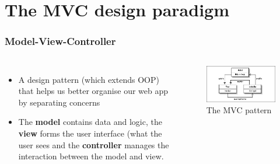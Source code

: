 \documentclass[10pt,t,xcolor=dvipsnames]{beamer}
\begin{document}
\section{The MVC design paradigm}
\begin{frame}[fragile]
\frametitle{Model-View-Controller}
\pause
\begin{columns}[l]
\begin{itemize}[<+->]
\item A design pattern (which extends OOP) that helps us better organise our web app by \alert{separating concerns}
\item The \textbf{model} contains \alert{data and logic}, the \textbf{view} forms the \alert{user interface} (what the user sees and the \textbf{controller} manages the \alert{interaction} between the model and view.
\end{itemize}
\vspace{-0.5cm}
\begin{figure}
\hspace*{-0.5cm}
\centering
\includegraphics[scale=0.4]{../images/mvc-02.jpg}
\caption{The MVC pattern}
\end{figure}
\end{columns}
\end{frame}
\end{document}
